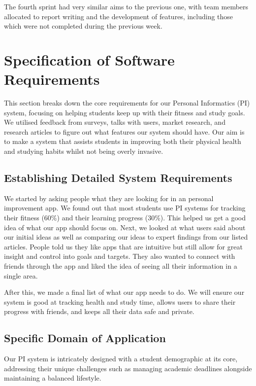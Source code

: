\documentclass[12pt]{article}
\begin{document}
The fourth sprint had very similar aims to the previous one, with team members allocated to report writing and the development of features, including those which were not completed during the previous week. 

\newpage
\section{Specification of Software Requirements}

This section breaks down the core requirements for our Personal Informatics
(PI) system, focusing on helping students keep up with their fitness and study
goals. We utilised feedback from surveys, talks with users, market research,
and research articles to figure out what features our system should have. Our
aim is to make a system that assists students in improving both their physical
health and studying habits whilst not being overly invasive.

\subsection{Establishing Detailed System Requirements}

We started by asking people what they are looking for in an personal
improvement app. We found out that most students use PI systems for
tracking their fitness (60\%) and their learning progress (30\%). This
helped us get a good idea of what our app should focus on. Next, we looked
at what users said about our initial ideas as well as comparing our ideas
to expert findings from our listed articles. People told us they like apps
that are intuitive but still allow for great insight and control into goals
and targets. They also wanted to connect with friends through the app and
liked the idea of seeing all their information in a single area.\par

After this, we made a final list of what our app needs to do. We will
ensure our system is good at tracking health and study time, allows users
to share their progress with friends, and keeps all their data safe and
private.
 
\subsection{Specific Domain of Application}

Our PI system is intricately designed with a student demographic at its core,
addressing their unique challenges such as managing academic deadlines
alongside maintaining a balanced lifestyle.\par 
\end{document}
